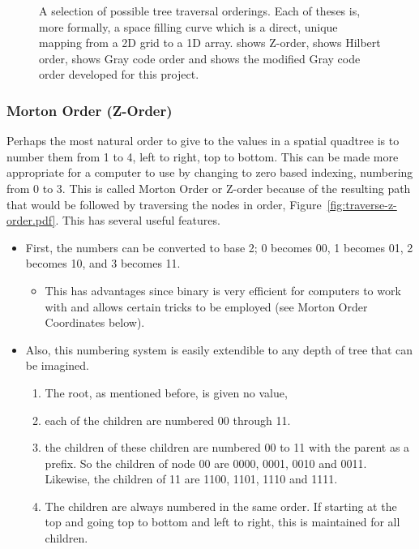 \begin{figure}[tbh]
	\caption[A selection of possible tree traversal orderings]{A selection of
		possible tree traversal orderings. Each of theses is, more formally, a
		space filling curve which is a direct, unique mapping from a 2D grid to
		a 1D array.  shows Z-order,
		 shows Hilbert order,
		 shows Gray code order and
		 shows the modified Gray code
		order developed for this project.}\label{fig:order_traversals}
\end{figure}

\subsubsection[Morton Order]{Morton Order (Z-Order)}
\label{ssub:morton_code_z_order_}

Perhaps the most natural order to give to the values in a spatial quadtree is
to number them from 1 to 4, left to right, top to bottom. This can be made more
appropriate for a computer to use by changing to zero based indexing,
numbering from 0 to 3. This is called Morton Order\cite{mortoncomputer} or
Z-order because of the resulting path that would be followed by traversing the
nodes in order, Figure~\ref{fig:traverse-z-order.pdf}. This has several useful
features.

\begin{itemize}
	\item First, the numbers can be converted to base 2; 0 becomes 00, 1
		becomes 01, 2 becomes 10, and 3 becomes 11.

		\begin{itemize}
			\item This has advantages since binary is very efficient for
				computers to work with and allows certain tricks to be employed
				(see Morton Order Coordinates below).
		\end{itemize}

	\item Also, this numbering system is easily extendible to any depth of
	tree that can be imagined.

	\begin{enumerate}
		\item The root, as mentioned before, is given no value,
		\item each of the children are numbered {00} through 11.

		\item the children of these children are numbered 00 to 11 with the
		parent as a prefix. So the children of node 00 are 0000, 0001, 0010
		and 0011. Likewise, the children of 11 are 1100, 1101, 1110 and 1111.

		\item The children are always numbered in the same order. If starting
		at the top and going top to bottom and left to right, this is
		maintained for all children.
	\end{enumerate}
\end{itemize}

